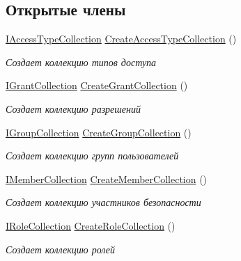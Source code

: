 \subsection*{Открытые члены}
\begin{DoxyCompactItemize}
\item 
\hyperlink{interface_security_1_1_interfaces_1_1_collections_1_1_i_access_type_collection}{I\+Access\+Type\+Collection} \hyperlink{interface_security_1_1_interfaces_1_1_i_security_factory_a1b9629f58201d2335c7027f1f3653718}{Create\+Access\+Type\+Collection} ()
\begin{DoxyCompactList}\small\item\em Создает коллекцию типов доступа \end{DoxyCompactList}\item 
\hyperlink{interface_security_1_1_interfaces_1_1_collections_1_1_i_grant_collection}{I\+Grant\+Collection} \hyperlink{interface_security_1_1_interfaces_1_1_i_security_factory_aaf6f0d74a597fc683462caa7900c363b}{Create\+Grant\+Collection} ()
\begin{DoxyCompactList}\small\item\em Создает коллекцию разрешений \end{DoxyCompactList}\item 
\hyperlink{interface_security_1_1_interfaces_1_1_collections_1_1_i_group_collection}{I\+Group\+Collection} \hyperlink{interface_security_1_1_interfaces_1_1_i_security_factory_a40b900dd3f5097db8ac77610cbc54e58}{Create\+Group\+Collection} ()
\begin{DoxyCompactList}\small\item\em Создает коллекцию групп пользователей \end{DoxyCompactList}\item 
\hyperlink{interface_security_1_1_interfaces_1_1_collections_1_1_i_member_collection}{I\+Member\+Collection} \hyperlink{interface_security_1_1_interfaces_1_1_i_security_factory_af51be7d74fbdd43fe5970ab28359ef2a}{Create\+Member\+Collection} ()
\begin{DoxyCompactList}\small\item\em Создает коллекцию участников безопасности \end{DoxyCompactList}\item 
\hyperlink{interface_security_1_1_interfaces_1_1_collections_1_1_i_role_collection}{I\+Role\+Collection} \hyperlink{interface_security_1_1_interfaces_1_1_i_security_factory_a7c007d1bc58724fb8a546ac67a4ad649}{Create\+Role\+Collection} ()
\begin{DoxyCompactList}\small\item\em Создает коллекцию ролей \end{DoxyCompactList}\item 

\end{DoxyCompactItemize}
